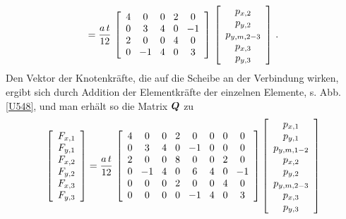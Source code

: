 {\begin{align}
= \frac{ a\,t}{12}\,\left[\barr{c @{\hspace{3mm}} c @{\hspace{3mm}} c @{\hspace{3mm}} c @{\hspace{3mm}} c} 4 & 0 & 0 &2 & 0 \\ 0 & 3 & 4 &0 & -1\\  2 & 0 & 0 &4 & 0 \\
 0 & -1 & 4 &0 & 3  \earr \right]\,\left[\barr{c} p_{x,2} \\ p_{y,2} \\ p_{y,m,2-3} \\ p_{x,3} \\ p_{y,3} \earr \right]\,.
\end{align}
Den Vektor der Knotenkr\"{a}fte, die auf die Scheibe an der Verbindung wirken, ergibt sich durch Addition der Elementkr\"{a}fte der einzelnen Elemente, s. Abb. \ref{U548}, und man erh\"{a}lt so die Matrix $\mbox{\boldmath $Q$} $ zu
\begin{align}
\left[\barr{c} F_{x,1} \\ F_{y,1} \\ F_{x,2} \\ F_{y,2} \\ F_{x,3} \\ F_{y,3}\earr \right] = \frac{a\,t}{12}\,\left[\barr{c @{\hspace{3mm}} c @{\hspace{3mm}} c @{\hspace{3mm}} c @{\hspace{3mm}} c @{\hspace{3mm}} c @{\hspace{3mm}} c @{\hspace{3mm}} c} 4 &0 &0 &2 &0 &0 &0 &0\\
0 &3 &4 &0 &-1 &0 &0 &0 \\
2 &0 &0 &8 &0 &0 &2 &0 \\ 0 &-1 &4 &0 &6 &4 &0 &-1 \\ 0 &0 & 0 &2 &0 &0 &4 &0 \\
0 & 0 &0 &0 &-1 &4 &0 &3\earr \right]
\left[\barr{c} p_{x,1} \\ p_{y,1} \\ p_{y,m,1-2} \\ p_{x,2} \\ p_{y,2} \\ p_{y,m,2-3} \\ p_{x,3} \\ p_{y,3}\earr \right]
\end{align}
}
